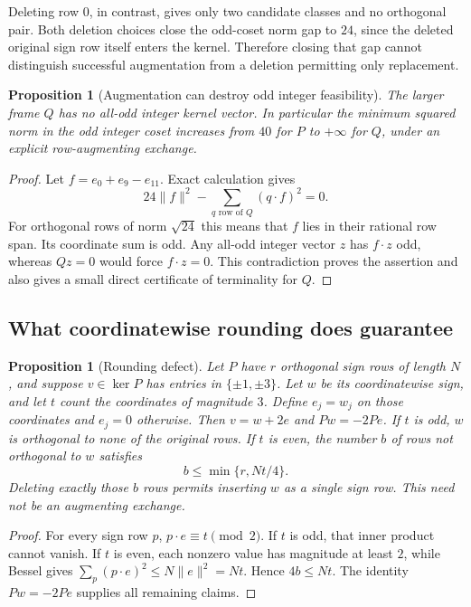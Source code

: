 \documentclass[11pt]{article}
\newtheorem{proposition}[theorem]{Proposition}
\begin{document}
Deleting row $0$, in contrast, gives only two candidate classes and
no orthogonal pair. Both deletion choices close the odd-coset norm gap
to $24$, since the deleted original sign row itself enters the kernel.
Therefore closing that gap cannot distinguish successful augmentation
from a deletion permitting only replacement.

\begin{proposition}[Augmentation can destroy odd integer feasibility]
The larger frame $Q$ has no all-odd integer kernel vector. In particular
the minimum squared norm in the odd integer coset increases from
$40$ for $P$ to $+\infty$ for $Q$, under an explicit row-augmenting
exchange.
\end{proposition}
\begin{proof}
Let $f=e_0+e_9-e_{11}$. Exact calculation gives
\[
 24\|f\|^2-\sum_{q\text{ row of }Q}(q\cdot f)^2=0.
\]
For orthogonal rows of norm $\sqrt{24}$ this means that $f$ lies in
their rational row span. Its coordinate sum is odd. Any all-odd integer
vector $z$ has $f\cdot z$ odd, whereas $Qz=0$ would force
$f\cdot z=0$. This contradiction proves the assertion and also gives
a small direct certificate of terminality for $Q$.
\end{proof}

\subsection{What coordinatewise rounding does guarantee}
\begin{proposition}[Rounding defect]
Let $P$ have $r$ orthogonal sign rows of length $N$, and suppose
$v\in\ker P$ has entries in $\{\pm1,\pm3\}$. Let $w$ be its
coordinatewise sign, and let $t$ count the coordinates of magnitude
$3$. Define $e_j=w_j$ on those coordinates and $e_j=0$ otherwise.
Then $v=w+2e$ and $Pw=-2Pe$.
If $t$ is odd, $w$ is orthogonal to \emph{none} of the original rows.
If $t$ is even, the number $b$ of rows not orthogonal to $w$ satisfies
\[
 b\le\min\{r,Nt/4\}.
\]
Deleting exactly those $b$ rows permits inserting $w$ as a single
sign row. This need not be an augmenting exchange.
\end{proposition}
\begin{proof}
For every sign row $p$, $p\cdot e\equiv t\pmod2$. If $t$ is odd,
that inner product cannot vanish. If $t$ is even, each nonzero value
has magnitude at least $2$, while Bessel gives
$\sum_p(p\cdot e)^2\le N\|e\|^2=Nt$. Hence $4b\le Nt$.
The identity $Pw=-2Pe$ supplies all remaining claims.
\end{proof}
\end{document}
